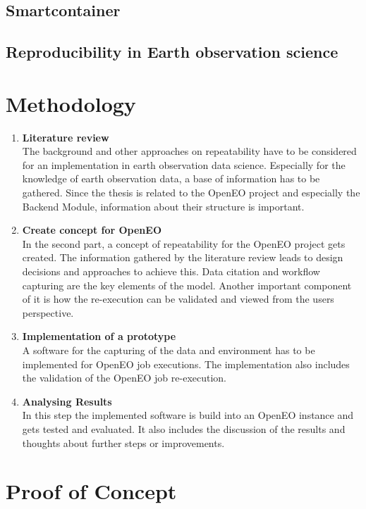 \documentclass[draft,final]{vutinfth} %
\begin{document}
\section{Smartcontainer}
\section{Reproducibility in Earth observation science}
\chapter{Methodology}
\begin{enumerate}
	\item \textbf{Literature review} \\
	The background and other approaches on repeatability have to be considered for an implementation in earth observation data science. Especially for the knowledge of earth observation data, a base of information has to be gathered. Since the thesis is related to the OpenEO project and especially the Backend Module, information about their structure is important. 
	\item\textbf{Create concept for OpenEO} \\
	In the second part, a concept of repeatability for the OpenEO project gets created. The information gathered by the literature review leads to design decisions and approaches to achieve this. Data citation and workflow capturing are the key elements of the model. Another important component of it is how the re-execution can be validated and viewed from the users perspective.
	\item \textbf{Implementation of a prototype} \\
	A software for the capturing of the data and environment has to be implemented for OpenEO job executions. The implementation also includes the validation of the OpenEO job re-execution.
	\item \textbf{Analysing Results} \\
	In this step the implemented software is build into an OpenEO instance and gets tested and evaluated. It also includes the discussion of the results and thoughts about further steps or improvements.
\end{enumerate}
\chapter{Proof of Concept}
\end{document}
